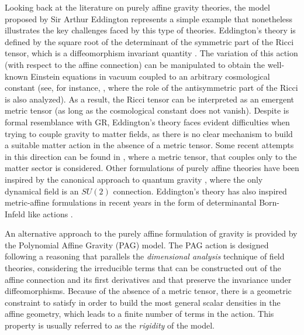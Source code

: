Looking back at the literature on purely affine gravity theories, the model proposed by  Sir Arthur  Eddington \cite{Eddington1923-EDDTMT,schrodinger1985space} represents a simple example that nonetheless illustrates the key challenges faced by this type of theories. Eddington's theory is defined by the square root of the determinant of the symmetric part of the Ricci tensor, which is a diffeomorphism invariant quantity \cite{eisenhart1972non}. The variation of this action (with respect to the affine connection) can be manipulated to obtain the well-known Einstein equations in vacuum coupled to an arbitrary cosmological constant (see, for instance, \cite{POP_AWSKI_2007}, where the role of the antisymmetric part of the Ricci is also analyzed). As a result, the Ricci tensor can be interpreted as an emergent metric tensor (as long as the cosmological constant does not vanish). Despite is formal resemblance with GR, Eddington's theory faces evident difficulties when trying to couple gravity to matter fields, as there is no clear mechanism to build a suitable matter action in the absence of a metric tensor. Some recent attempts in this direction can be found in \cite{Knorr_2021,POP_AWSKI_2008,Pop_awski_2009,Filippov_2010,Azri_2015}, where  a metric tensor, that couples only to the matter sector is considered. Other formulations of purely affine theories have been inspired by the canonical approach to quantum gravity \cite{Krasnov_2011}, where the only dynamical field is an $SU(2)$ connection. Eddington's theory has also inspired metric-affine formulations  in recent years in the form of determinantal Born-Infeld like actions \cite{BI_Gravity,Deser_1998,Vollick:2003qp,Banados:2010ix,Jim_nez_2021,Afonso:2021aho}. 

An alternative approach to the purely affine formulation of gravity is provided by the Polynomial Affine Gravity (PAG) model. The PAG action is designed following a reasoning that parallels the \textit{dimensional analysis} technique of field theories, considering the irreducible terms that can be constructed out of the affine connection and its first derivatives and that preserve the invariance under diffeomorphisms. Because of the absence of a metric tensor, there is a geometric constraint to satisfy in order to build the most general scalar densities in the affine geometry, which leads to a finite number of terms in the action. This property is usually referred to as the \textit{rigidity} of the model.

